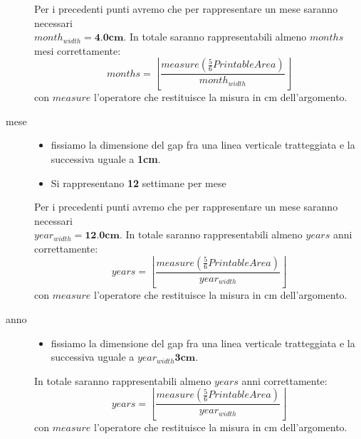 \begin{description}
Per i precedenti punti avremo che per rappresentare un mese saranno
necessari\\ $month_{width} = \textbf{4.0cm}$. In totale saranno rappresentabili 
almeno $months$ mesi correttamente:
\begin{displaymath}
	months = \left \lfloor \frac{measure \left (\frac{5}{6}PrintableArea
	\right)}{month_{width}}\right \rfloor
\end{displaymath}
con $measure$ l'operatore che restituisce la misura in cm dell'argomento.

\item[mese] \quad
\begin{itemize}
  \item fissiamo la dimensione del gap fra una linea verticale tratteggiata
e la successiva uguale a \textbf{1cm}.
  \item Si rappresentano \textbf{12} settimane per mese
\end{itemize}

Per i precedenti punti avremo che per rappresentare un mese saranno
necessari\\ $year_{width} = \textbf{12.0cm}$. In totale saranno rappresentabili 
almeno $years$ anni correttamente:
\begin{displaymath}
	years = \left \lfloor \frac{measure \left (\frac{5}{6}PrintableArea
	\right)}{year_{width}}\right \rfloor
\end{displaymath}
con $measure$ l'operatore che restituisce la misura in cm dell'argomento.

\item[anno] \quad
\begin{itemize}
  \item fissiamo la dimensione del gap fra una linea verticale tratteggiata
e la successiva uguale a $year_{width}\textbf{3cm}$.
\end{itemize}

In totale saranno rappresentabili almeno $years$ anni correttamente:
\begin{displaymath}
	years = \left \lfloor \frac{measure \left (\frac{5}{6}PrintableArea
	\right)}{year_{width}}\right \rfloor
\end{displaymath}
con $measure$ l'operatore che restituisce la misura in cm dell'argomento.
\end{description}






